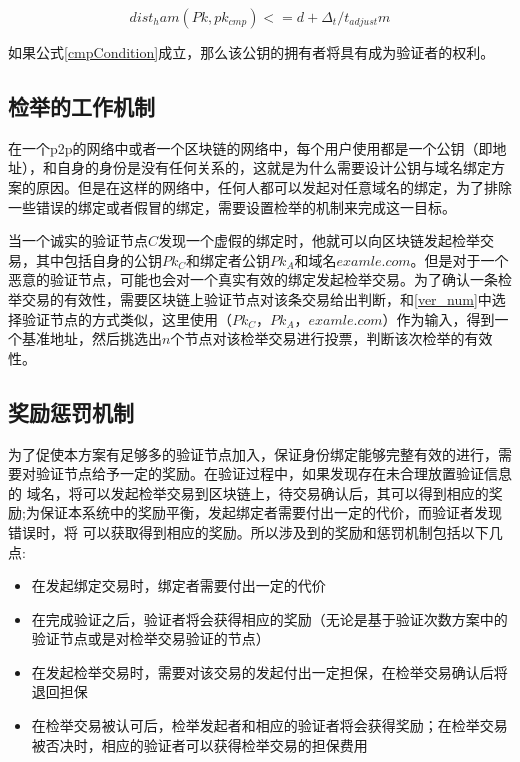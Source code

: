 \begin{equation}\label{cmpCondition}
dist_ham(Pk, pk_{cmp}) <= d + \Delta_t / t_{adjust}m
\end{equation}

如果公式\ref{cmpCondition}成立，那么该公钥的拥有者将具有成为验证者的权利。




\subsection{检举的工作机制}

在一个p2p的网络中或者一个区块链的网络中，每个用户使用都是一个公钥（即地址），和自身的身份是没有任何关系的，这就是为什么需要设计公钥与域名绑定方案的原因。但是在这样的网络中，任何人都可以发起对任意域名的绑定，为了排除一些错误的绑定或者假冒的绑定，需要设置检举的机制来完成这一目标。

当一个诚实的验证节点$C$发现一个虚假的绑定时，他就可以向区块链发起检举交易，其中包括自身的公钥$Pk_C$和绑定者公钥$Pk_A$和域名$examle.com$。但是对于一个恶意的验证节点，可能也会对一个真实有效的绑定发起检举交易。为了确认一条检举交易的有效性，需要区块链上验证节点对该条交易给出判断，和\ref{ver_num}中选择验证节点的方式类似，这里使用（$Pk_C$，$Pk_A$，$examle.com$）作为输入，得到一个基准地址，然后挑选出$n$个节点对该检举交易进行投票，判断该次检举的有效性。


\subsection{奖励惩罚机制}

为了促使本方案有足够多的验证节点加入，保证身份绑定能够完整有效的进行，需要对验证节点给予一定的奖励。在验证过程中，如果发现存在未合理放置验证信息的 域名，将可以发起检举交易到区块链上，待交易确认后，其可以得到相应的奖励;为保证本系统中的奖励平衡，发起绑定者需要付出一定的代价，而验证者发现错误时，将 可以获取得到相应的奖励。所以涉及到的奖励和惩罚机制包括以下几点:

\begin{itemize}
	\item 在发起绑定交易时，绑定者需要付出一定的代价
	\item 在完成验证之后，验证者将会获得相应的奖励（无论是基于验证次数方案中的验证节点或是对检举交易验证的节点）
	\item 在发起检举交易时，需要对该交易的发起付出一定担保，在检举交易确认后将退回担保
	\item 在检举交易被认可后，检举发起者和相应的验证者将会获得奖励；在检举交易被否决时，相应的验证者可以获得检举交易的担保费用
\end{itemize}

